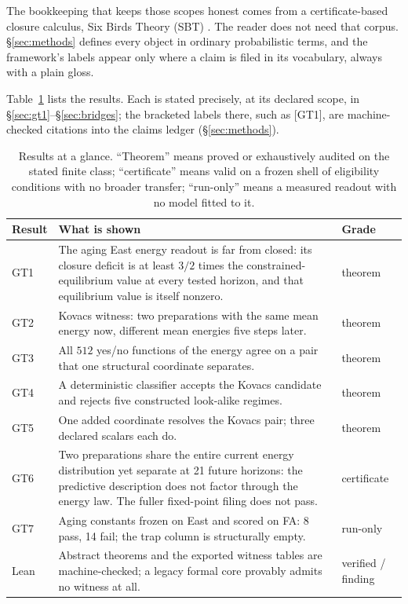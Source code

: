 The bookkeeping that keeps those scopes honest comes from a certificate-based closure calculus,
Six Birds Theory (SBT) . The reader does not
need that corpus. \S\ref{sec:methods} defines every object in ordinary probabilistic terms, and the
framework's labels appear only where a claim is filed in its vocabulary, always with a plain
gloss.

Table~\ref{tab:at-a-glance} lists the results. Each is stated precisely, at its declared scope, in
\S\ref{sec:gt1}--\S\ref{sec:bridges}; the bracketed labels there, such as [GT1], are
machine-checked citations into the claims ledger (\S\ref{sec:methods}).

\begin{table}[htbp]
  \centering
  \caption{Results at a glance. ``Theorem'' means proved or exhaustively audited on the stated
    finite class; ``certificate'' means valid on a frozen shell of eligibility conditions with no
    broader transfer; ``run-only'' means a measured readout with no model fitted to it.}
  \label{tab:at-a-glance}
  \small
  \begin{tabularx}{\linewidth}{@{}l>{\raggedright\arraybackslash}X l@{}}
    \toprule
    Result & What is shown & Grade \\
    \midrule
    GT1 & The aging East energy readout is far from closed: its closure deficit is at least $3/2$
      times the constrained-equilibrium value at every tested horizon, and that equilibrium value
      is itself nonzero. & theorem \\
    GT2 & Kovacs witness: two preparations with the same mean energy now, different mean
      energies five steps later. & theorem \\
    GT3 & All $512$ yes/no functions of the energy agree on a pair that one structural
      coordinate separates. & theorem \\
    GT4 & A deterministic classifier accepts the Kovacs candidate and rejects five constructed
      look-alike regimes. & theorem \\
    GT5 & One added coordinate resolves the Kovacs pair; three declared scalars each do. &
      theorem \\
    GT6 & Two preparations share the entire current energy distribution yet separate at 21 future
      horizons: the predictive description does not factor through the energy law. The fuller
      fixed-point filing does not pass. & certificate \\
    GT7 & Aging constants frozen on East and scored on FA: 8 pass, 14 fail; the trap column is
      structurally empty. & run-only \\
    Lean & Abstract theorems and the exported witness tables are machine-checked; a legacy
      formal core provably admits no witness at all. & verified / finding \\
    \bottomrule
  \end{tabularx}
\end{table}

